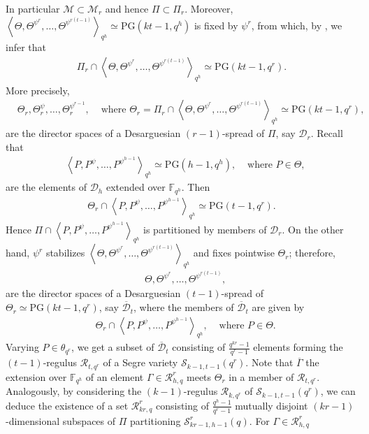 \documentclass[11pt]{article}
\theoremstyle{definition}
\numberwithin{equation}{section}
\def\cM{\mathcal M}
\def\cD{\mathcal D}
\def\cR{\mathcal R}
\def\cS{\mathcal S}
\def\PG{\mathrm{PG}}
\def\F{{\mathbb F}}
\begin{document}
In particular $\cM \subset \cM_r$ and hence $\Pi \subset \Pi_r$. Moreover, $\left\langle \Theta, \Theta^{\psi^r}, \dots, \Theta^{\psi^{r(t-1)}} \right\rangle_{q^h} \simeq \PG(kt-1, q^h)$ is fixed by $\psi^r$, from which, by \cite[Lemma 1]{lunardon1999normal}, we infer that 
\begin{align*}
\Pi_r \cap \left\langle \Theta, \Theta^{\psi^r}, \dots, \Theta^{\psi^{r(t-1)}} \right\rangle_{q^h} \simeq \PG(kt-1, q^r).
\end{align*}
More precisely, 
\begin{align*}
& \Theta_r, \Theta_r^\psi, \dots, \Theta_r^{\psi^{r-1}}, & \mbox{ where } \Theta_r = \Pi_r \cap \left\langle \Theta, \Theta^{\psi^r}, \dots, \Theta^{\psi^{r(t-1)}} \right\rangle_{q^h} \simeq \PG(kt-1, q^r), 
\end{align*}
are the director spaces of a Desarguesian $(r-1)$-spread of $\Pi$, say $\cD_{r}$. Recall that 
\begin{align*}
& \left\langle P, P^\psi, \dots, P^{\psi^{h-1}} \right\rangle_{q^h} \simeq \PG(h-1, q^h), & \mbox{ where } P \in \Theta, 
\end{align*}
are the elements of $\cD_h$ extended over $\F_{q^h}$. Then 
\begin{align*}
\Theta_r \cap  \left\langle P, P^\psi, \dots, P^{\psi^{h-1}} \right\rangle_{q^h} \simeq \PG(t-1, q^r).
\end{align*}
Hence $\Pi \cap \left\langle P, P^\psi, \dots, P^{\psi^{h-1}} \right\rangle_{q^h}$ is partitioned by members of $\cD_r$. On the other hand, $\psi^r$ stabilizes $\left\langle \Theta, \Theta^{\psi^r}, \dots, \Theta^{\psi^{r(t-1)}} \right\rangle_{q^h}$ and fixes pointwise $\Theta_r$; therefore, 
\begin{align*}
& \Theta, \Theta^{\psi^r}, \dots, \Theta^{\psi^{r(t-1)}}, 
\end{align*}
are the director spaces of a Desarguesian $(t-1)$-spread of $\Theta_r \simeq \PG(kt-1, q^r)$, say $\overline{\cD}_{t}$, where the members of $\overline{\cD}_t$ are given by 
\begin{align*}
& \Theta_r \cap \left\langle P, P^\psi, \dots, P^{\psi^{h-1}} \right\rangle_{q^h}, & \mbox{ where } P \in \Theta.
\end{align*}
Varying $P \in \theta_{q^r}$, we get a subset of $\overline{\cD}_t$ consisting of $\frac{q^{kr}-1}{q^r-1}$ elements forming the $(t-1)$-regulus $\cR_{t, q^r}$ of a Segre variety $\cS_{k-1, t-1}(q^r)$. Note that $\overline{\Gamma}$ the extension over $\F_{q^h}$ of an element $\Gamma \in \cR^r_{h, q}$ meets $\Theta_r$ in a member of $\cR_{t, q^r}$. Analogously, by considering the $(k-1)$-regulus $\cR_{k, q^r}$ of $\cS_{k-1, t-1}(q^r)$, we can deduce the existence of a set $\cR^r_{kr, q}$ consisting of $\frac{q^{h}-1}{q^r-1}$ mutually disjoint $(kr-1)$-dimensional subspaces of $\Pi$ partitioning $\cS^r_{kr-1, h-1}(q)$. For $\Gamma \in \cR^r_{h, q}$ 
\end{document}

